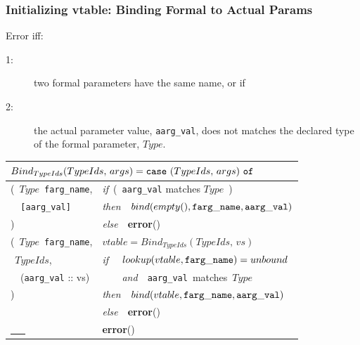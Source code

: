 \documentclass{beamer}
\newcommand{\emp}[1]{\textcolor{DikuRed}{ #1}}
\begin{document}
\begin{frame}
\frametitle{Initializing vtable: Binding Formal to Actual Params}

Error iff:
\begin{description}
    \item[\emp{1:}] two formal parameters have the same name, or if\smallskip
    \item[\alert{2:}] the actual parameter value, {\tt aarg\_val}, does not matches
        the declared type of the formal parameter, $Type$.
\end{description}

\bigskip

\begin{tabular}{|l|l|}\hline
\multicolumn{2}{|l|}{$Bind_{TypeIds}(TypeIds,\,args)
 = \mbox{\tt case}~(TypeIds,\,args)~\mbox{\tt of} $} \\\hline

(~$Type$~{\tt farg\_name},
        & {\em if}~(~\alert{{\tt aarg\_val} matches $Type$}~) \\
{\tt ~~[aarg\_val]} 
        & {\em then}~~$bind(empty(), {\tt farg\_name, aarg\_val})$ \\
)        & {\em else}~~{\bf error}()\\\hline

(~$Type$~{\tt farg\_name},
        & $vtable = Bind_{TypeIds}(TypeIds,\, vs)$ \\        
$~~TypeIds$,
        & {\em if}~~\emp{$lookup(vtable,{\tt farg\_name}) = unbound$}\\
~~({\tt aarg\_val} :: vs)
        & ~~~~{\em and}~~\alert{{\tt aarg\_val}~matches~$Type$}\\
)
        & {\em then}~~$bind(vtable,{\tt farg\_name},{\tt aarg\_val})$ \\
        & {\em else}~~{\bf error}() \\\hline

\underline{~~~}
        & {\bf error}() \\\hline
\end{tabular}

\end{frame}
\end{document}
